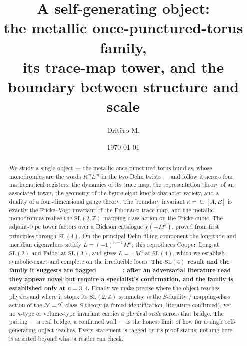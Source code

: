 \documentclass[11pt,reqno]{amsart}
\newcommand{\badge}[2]{{\setlength{\fboxsep}{2pt}%
  \colorbox{#1}{\textcolor{white}{\sffamily\bfseries\scriptsize #2}}}}
\newcommand{\sGated}{\badge{stGated}{GATED}}
\theoremstyle{plain}
\theoremstyle{definition}
\theoremstyle{remark}
\newcommand{\SL}{\mathrm{SL}}
\newcommand{\tr}{\operatorname{tr}}
\newcommand{\Z}{\mathbb{Z}}
\newcommand{\kk}{\kappa}
\begin{document}
\title[A self-generating object: tower, knot, and the boundary of scale]{A self-generating object:\\
the metallic once-punctured-torus family,\\ its trace-map tower, and the boundary between structure and scale}

\author{Dritëro M.}
\address{Independent researcher, Prishtina.}

\date{\today}

\begin{abstract}
We study a single object --- the metallic once-punctured-torus bundles, whose
monodromies are the words $R^mL^m$ in the two Dehn twists --- and follow it across
four mathematical registers: the dynamics of its trace map, the representation
theory of an associated tower, the geometry of the figure-eight knot's character
variety, and a duality of a four-dimensional gauge theory. The boundary invariant
$\kk=\tr[A,B]$ is exactly the Fricke--Vogt invariant of the Fibonacci trace map,
and the metallic monodromies realise the $\SL(2,\Z)$ mapping-class action on the
Fricke cubic. The adjoint-type tower factors over a Dickson catalogue
$\chi(\pm M^k)$, proved from first principles through $\SL(4)$. On the principal
Dehn-filling component the longitude and meridian eigenvalues satisfy
$L=(-1)^{n-1}M^n$; this reproduces Cooper--Long at $\SL(2)$ and Falbel at $\SL(3)$,
and gives $L=-M^4$ at $\SL(4)$, which we establish symbolic-exact and complete on
the irreducible locus. \textbf{The $\SL(4)$ result and the family it suggests are
flagged \sGated: after an adversarial literature read they appear novel but require
a specialist's confirmation, and the family is established only at $n=3,4$.}
Finally we make precise where the object reaches physics and where it stops: its
$\SL(2,\Z)$ symmetry \emph{is} the $S$-duality / mapping-class action of the
$\mathcal{N}=2^\ast$ class-$S$ theory (a forced identification, literature-confirmed),
yet no $\kk$-type or volume-type invariant carries a physical \emph{scale} across
that bridge. The pairing --- a real bridge, a confirmed wall --- is the honest
limit of how far a single self-generating object reaches. Every statement is tagged
by its proof status; nothing here is asserted beyond what a reader can check.
\end{abstract}

\maketitle














\end{document}
